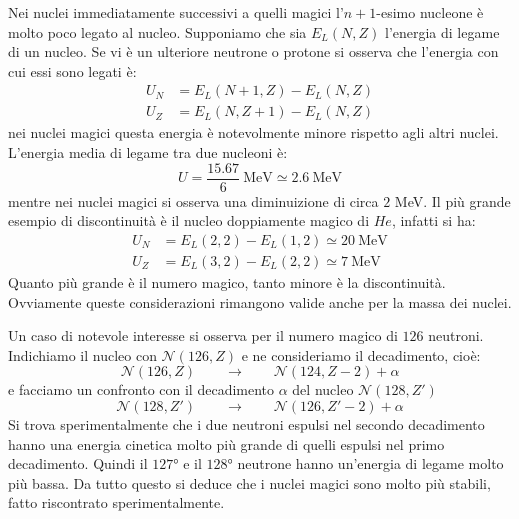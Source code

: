 Nei nuclei immediatamente successivi a quelli magici l'$n+1$-esimo nucleone è
molto poco legato al nucleo. Supponiamo che sia $E_L{(N, Z)}$ l'energia di
legame di un nucleo. Se vi è un ulteriore neutrone o protone si osserva che
l'energia con cui essi sono legati è:
\begin{equation}
\begin{split}
U_N &= E_L{(N + 1, Z)} - E_L{(N, Z)}\\
U_Z &= E_L{(N, Z + 1)} - E_L{(N, Z)}
\end{split}
\end{equation}
nei nuclei magici questa energia è notevolmente minore rispetto agli altri
nuclei. L'energia media di legame tra due nucleoni è:
\begin{equation}
U = \frac{15.67}{6}\ \text{MeV} \simeq 2.6\ \text{MeV}
\end{equation}
mentre nei nuclei magici si osserva una diminuizione di circa $2$ MeV. Il più
grande esempio di discontinuità è il nucleo doppiamente magico di $He$, infatti
si ha:
\begin{equation}
\begin{split}
U_N &= E_L{(2, 2)} - E_L{(1, 2)} \simeq 20\ \text{MeV}\\
U_Z &= E_L{(3, 2)} - E_L{(2,2)} \simeq 7\ \text{MeV}
\end{split}
\end{equation}
Quanto più grande è il numero magico, tanto minore è la discontinuità.
Ovviamente queste considerazioni rimangono valide anche per la massa dei nuclei.

Un caso di notevole interesse si osserva per il numero magico di $126$ neutroni.
Indichiamo il nucleo con $\mathcal{N}{(126, Z)}$ e ne consideriamo il
decadimento, cioè:
\begin{equation}
\mathcal{N}{(126, Z)} \qquad \rightarrow \qquad \mathcal{N}{(124, Z-2)} + \alpha
\end{equation}
e facciamo un confronto con il decadimento $\alpha$ del nucleo $\mathcal{N}{(128, Z')}$
\begin{equation}
\mathcal{N}{(128, Z')} \qquad \rightarrow \qquad \mathcal{N}{(126, Z'-2)} + \alpha
\end{equation}
Si trova sperimentalmente che i due neutroni espulsi nel secondo decadimento
hanno una energia cinetica molto più grande di quelli espulsi nel primo
decadimento. Quindi il $127$° e il $128$° neutrone hanno un'energia di legame
molto più bassa. Da tutto questo si deduce che i nuclei magici sono molto più
stabili, fatto riscontrato sperimentalmente.

